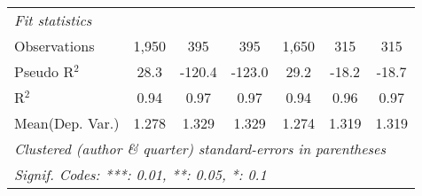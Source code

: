 \begin{tabular}{lcccccc}
   \midrule
   \emph{Fit statistics}\\
   Observations            & 1,950   & 395          & 395     & 1,650   & 315     & 315\\  
   Pseudo R$^2$            & 28.3    & -120.4       & -123.0  & 29.2    & -18.2   & -18.7\\  
   R$^2$                   & 0.94    & 0.97         & 0.97    & 0.94    & 0.96    & 0.97\\  
Mean(Dep. Var.) & 1.278 & 1.329 & 1.329 & 1.274 & 1.319 & 1.319 \\
   \midrule \midrule
   \multicolumn{7}{l}{\emph{Clustered (author \& quarter) standard-errors in parentheses}}\\
   \multicolumn{7}{l}{\emph{Signif. Codes: ***: 0.01, **: 0.05, *: 0.1}}\\
\end{tabular}
\par\endgroup
